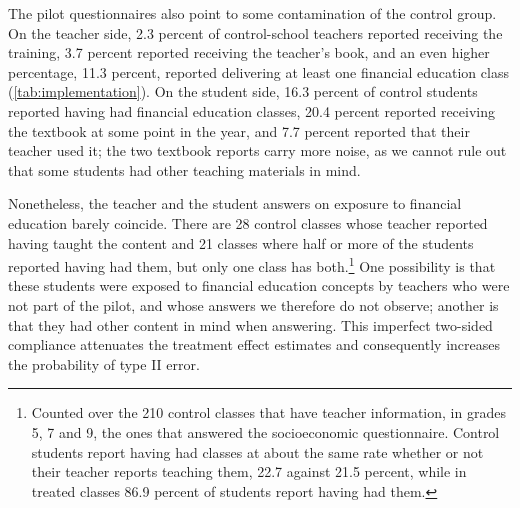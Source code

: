 The pilot questionnaires also point to some contamination of the control group. On the teacher side, 2.3 percent of control-school teachers reported receiving the training, 3.7 percent reported receiving the teacher's book, and an even higher percentage, 11.3 percent, reported delivering at least one financial education class (\autoref{tab:implementation}). On the student side, 16.3 percent of control students reported having had financial education classes, 20.4 percent reported receiving the textbook at some point in the year, and 7.7 percent reported that their teacher used it; the two textbook reports carry more noise, as we cannot rule out that some students had other teaching materials in mind.


Nonetheless, the teacher and the student answers on exposure to financial education barely coincide. There are 28 control classes whose teacher reported having taught the content and 21 classes where half or more of the students reported having had them, but only one class has both.\footnote{Counted over the 210 control classes that have teacher information, in grades 5, 7 and 9, the ones that answered the socioeconomic questionnaire. Control students report having had classes at about the same rate whether or not their teacher reports teaching them, 22.7 against 21.5 percent, while in treated classes 86.9 percent of students report having had them.} One possibility is that these students were exposed to financial education concepts by teachers who were not part of the pilot, and whose answers we therefore do not observe; another is that they had other content in mind when answering. This imperfect two-sided compliance attenuates the treatment effect estimates and consequently increases the probability of type II error.
